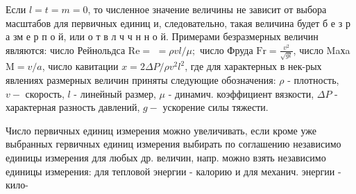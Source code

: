\documentclass[10pt]{article}
\begin{document}
Если $l=t=m=0$, то численное значение величины не зависит от выбора масштабов для первичных единиц и, следовательно, такая величина будет б е з р а зм е р п о й, или о т в л ч ч н н о й. Примерами безразмерных величин являются: число Рейнольдса $\mathrm{Re}=$ $=\rho v l / \mu ;$ число Фруда $\mathrm{Fr}=\frac{v^{2}}{\sqrt{g l}}$, число Maхa $\mathrm{M}=v / a$, число кавитации $x=2 \Delta P / \rho v^{2} l^{2}$, где для характерных в нек-рых явлениях размерных величин приняты следующие обозначения: $\rho$ - плотность, $v-$ скорость, $l$ - линейный размер, $\mu$ - динамич. коэффициент вязкости, $\Delta P$ - характерная разность давлений, $g-$ ускорение силы тяжести.



Число первичных единиц измерения можно увеличивать, если кроме уже выбранных гервичных единиц измерения выбирать по соглашению независимо единицы измерения для любых др. величин, напр. можно взять независимо единицы измерения: для тепловой энергии - калорию и для механич. энергии - кило-
\end{document}

